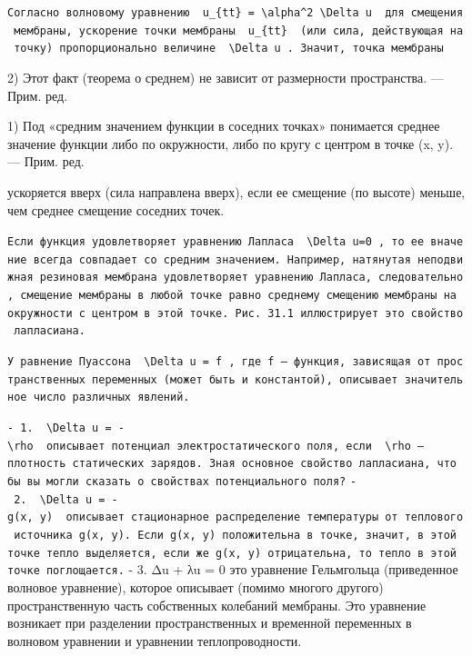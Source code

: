 \documentclass[
  ukrainian,
]{article}
\begin{document}
\texttt{Согласно\ волновому\ уравнению\ \ \textquotesingle{}u\_\{tt\}\ =\ \textbackslash{}alpha\^{}2\ \textbackslash{}Delta\ u\textquotesingle{}\ \ для\ смещения\ мембраны,\ ускорение\ точки\ мембраны\ \ \textquotesingle{}u\_\{tt\}\textquotesingle{}\ \ (или\ сила,\ действующая\ на\ точку)\ пропорционально\ величине\ \ \textquotesingle{}\textbackslash{}Delta\ u\textquotesingle{}\ .\ Значит,\ точка\ мембраны}

2) Этот факт (теорема о среднем) не зависит от размерности пространства.
--- Прим. ред.

1) Под «средним значением функции в соседних точках» понимается среднее
значение функции либо по окружности, либо по кругу с центром в точке (x,
y). --- Прим. ред.

ускоряется вверх (сила направлена вверх), если ее смещение (по высоте)
меньше, чем среднее смещение соседних точек.

\texttt{Если\ функция\ удовлетворяет\ уравнению\ Лапласа\ \ \textquotesingle{}\textbackslash{}Delta\ u=0\textquotesingle{}\ ,\ то\ ее\ вначение\ всегда\ совпадает\ со\ средним\ значением.\ Например,\ натянутая\ неподвижная\ резиновая\ мембрана\ удовлетворяет\ уравнению\ Лапласа,\ следовательно,\ смещение\ мембраны\ в\ любой\ точке\ равно\ среднему\ смещению\ мембраны\ на\ окружности\ с\ центром\ в\ этой\ точке.\ Рис.\ 31.1\ иллюстрирует\ это\ свойство\ лапласиана.}

\texttt{У\ равнение\ Пуассона\ \ \textquotesingle{}\textbackslash{}Delta\ u\ =\ f\textquotesingle{}\ ,\ где\ f\ —\ функция,\ зависящая\ от\ пространственных\ переменных\ (может\ быть\ и\ константой),\ описывает\ значительное\ число\ различных\ явлений.}

\texttt{-\ 1.\ \ \textquotesingle{}\textbackslash{}Delta\ u\ =\ -\textbackslash{}rho\textquotesingle{}\ \ описывает\ потенциал\ электростатического\ поля,\ если\ \ \textquotesingle{}\textbackslash{}rho\textquotesingle{}\ —плотность\ статических\ зарядов.\ Зная\ основное\ свойство\ лапласиана,\ что\ бы\ вы\ могли\ сказать\ о\ свойствах\ потенциального\ поля?}
\texttt{-\ 2.\ \ \textquotesingle{}\textbackslash{}Delta\ u\ =\ -g(x,\ y)\textquotesingle{}\ \ описывает\ стационарное\ распределение\ температуры\ от\ теплового\ источника\ \textquotesingle{}g(x,\ y)\textquotesingle{}.\ Если\ \textquotesingle{}g(x,\ y)\textquotesingle{}\ положительна\ в\ точке,\ значит,\ в\ этой\ точке\ тепло\ выделяется,\ если\ же\ \textquotesingle{}g(x,\ y)\textquotesingle{}\ отрицательна,\ то\ тепло\ в\ этой\ точке\ поглощается.}
- 3. Δu + λu = 0 это уравнение Гельмгольца (приведенное волновое
уравнение), которое описывает (помимо многого другого) пространственную
часть собственных колебаний мембраны. Это уравнение возникает при
разделении пространственных и временной переменных в волновом уравнении
и уравнении теплопроводности.
\end{document}
